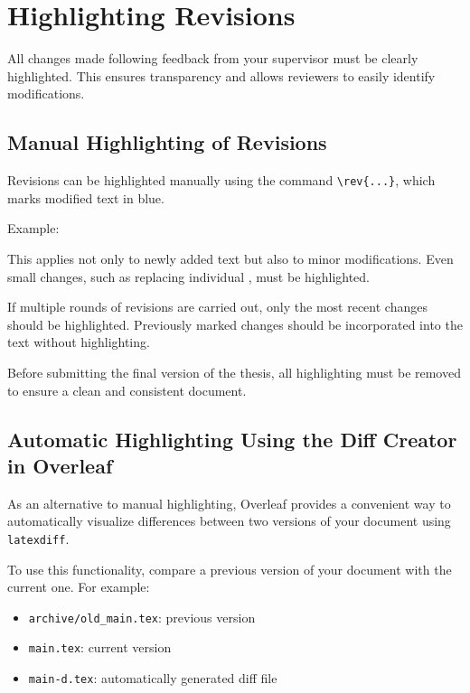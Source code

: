 \documentclass[a4paper, fleqn, headsepline, footsepline, 12pt, parskip=half]{scrartcl}
\begin{document}
\newpage
\section{Highlighting Revisions}
\label{sec:revisionsAfterCorrection}

All changes made following feedback from your supervisor must be clearly highlighted. This ensures transparency and allows reviewers to easily identify modifications.

\subsection{Manual Highlighting of Revisions}

Revisions can be highlighted manually using the command \verb|\rev{...}|, which marks modified text in blue.

Example:\\

This applies not only to newly added text but also to minor modifications. Even small changes, such as replacing individual , must be highlighted.

If multiple rounds of revisions are carried out, only the most recent changes should be highlighted. Previously marked changes should be incorporated into the text without highlighting.

Before submitting the final version of the thesis, all highlighting must be removed to ensure a clean and consistent document.

\subsection{Automatic Highlighting Using the Diff Creator in Overleaf}

As an alternative to manual highlighting, Overleaf provides a convenient way to automatically visualize differences between two versions of your document using \texttt{latexdiff}.

To use this functionality, compare a previous version of your document with the current one. For example:

\begin{itemize}
    \item \texttt{archive/old\_main.tex}: previous version
    \item \texttt{main.tex}: current version
    \item \texttt{main-d.tex}: automatically generated diff file
\end{itemize}
\end{document}
